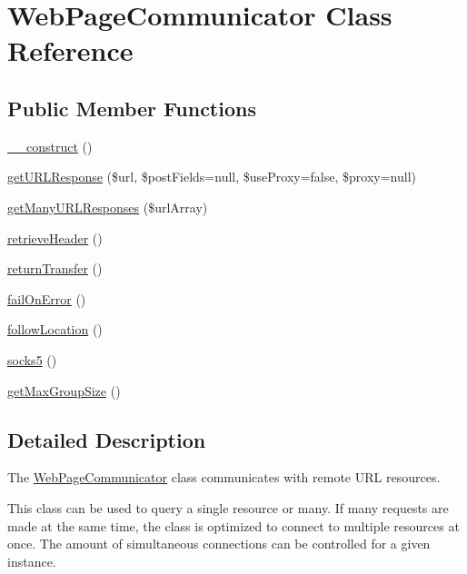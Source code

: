 \hypertarget{classWebPageCommunicator}{\section{Web\-Page\-Communicator Class Reference}
\label{classWebPageCommunicator}
}
\subsection*{Public Member Functions}
\begin{DoxyCompactItemize}
\item 
\hyperlink{classWebPageCommunicator_a03133488c53e7aef84610984f9a09b80}{\-\_\-\-\_\-construct} ()
\item 
\hyperlink{classWebPageCommunicator_aeb0373b10290d08fd652a1ef480d1cbb}{get\-U\-R\-L\-Response} (\$url, \$post\-Fields=null, \$use\-Proxy=false, \$proxy=null)
\item 
\hyperlink{classWebPageCommunicator_ab3b44e3eda30bac41260c0751fe17abb}{get\-Many\-U\-R\-L\-Responses} (\$url\-Array)
\item 
\hyperlink{classWebPageCommunicator_ae0893fe0ea103718ac28707db16d0f1a}{retrieve\-Header} ()
\item 
\hyperlink{classWebPageCommunicator_a8f79dedba9cd3b2861d9605383983594}{return\-Transfer} ()
\item 
\hyperlink{classWebPageCommunicator_a179398b8f6324410aa7d774f3d9eba8b}{fail\-On\-Error} ()
\item 
\hyperlink{classWebPageCommunicator_a65e4483c027b47c9b2e56f2cc69aa95b}{follow\-Location} ()
\item 
\hyperlink{classWebPageCommunicator_a8a440917c9c489527e4de701a2897971}{socks5} ()
\item 
\hyperlink{classWebPageCommunicator_a6514e11423ef4939ca85061fe0a62378}{get\-Max\-Group\-Size} ()
\end{DoxyCompactItemize}


\subsection{Detailed Description}
The \hyperlink{classWebPageCommunicator}{Web\-Page\-Communicator} class communicates with remote U\-R\-L resources.

This class can be used to query a single resource or many. If many requests are made at the same time, the class is optimized to connect to multiple resources at once. The amount of simultaneous connections can be controlled for a given instance. 

